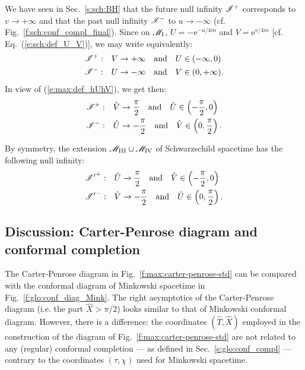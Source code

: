 We have seen in Sec.~\ref{s:sch:BH} that the future null infinity $\mathscr{I}^+$
corresponds to $v\rightarrow +\infty$ and that the past null infinity
$\mathscr{I}^-$ to $u\rightarrow -\infty$ (cf. Fig.~\ref{f:sch:conf_compl_final}).
Since on $\mathscr{M}_{\rm I}$, $U = - \mathrm{e}^{-u/4m}$ and $V = \mathrm{e}^{v/4m}$
[cf. Eq.~(\ref{e:sch:def_U_V})], we
may write equivalently:
\begin{subequations}
\begin{align}
    \mathscr{I}^+:&\quad V\rightarrow +\infty \quad\mbox{and}\quad U \in (-\infty, 0) \\
    \mathscr{I}^-:&\quad U\rightarrow -\infty \quad\mbox{and}\quad V \in (0,+\infty) .
\end{align}
\end{subequations}
In view of (\ref{e:max:def_hUhV}), we get then:
\begin{subequations}
\label{e:max:scri_hUhV}
\begin{align}
    \mathscr{I}^+:&\quad \hat{V}\rightarrow \frac{\pi}{2} \quad\mbox{and}\quad
        \hat{U} \in \left( -\frac{\pi}{2} , 0 \right) \\
    \mathscr{I}^-:&\quad \hat{U}\rightarrow -\frac{\pi}{2} \quad\mbox{and}\quad
         \hat{V} \in \left( 0 ,  \frac{\pi}{2} \right).
\end{align}
\end{subequations}

By symmetry, the extension $\mathscr{M}_{\rm III}\cup \mathscr{M}_{\rm IV}$ of Schwarzschild
spacetime has the following null infinity:
\begin{subequations}
\label{e:max:scri_prime_hUhV}
\begin{align}
    {\mathscr{I}'}^+:&\quad \hat{U}\rightarrow \frac{\pi}{2} \quad\mbox{and}\quad
        \hat{V} \in \left( -\frac{\pi}{2} , 0 \right) \\
    {\mathscr{I}'}^-:&\quad \hat{V}\rightarrow -\frac{\pi}{2} \quad\mbox{and}\quad
        \hat{U}\in \left( 0 ,  \frac{\pi}{2} \right).
\end{align}
\end{subequations}

\subsection{Discussion: Carter-Penrose diagram and conformal completion}
\label{s:max:discus_hUhV}

The Carter-Penrose diagram in Fig.~\ref{f:max:carter-penrose-std} can be compared with the conformal diagram
of Minkowski spacetime in Fig.~\ref{f:glo:conf_diag_Mink}.
The right asymptotics of the Carter-Penrose diagram
(i.e. the part $\hat{X}>\pi/2$) looks similar to that of
Minkowski conformal diagram.
However, there is a difference: the coordinates $(\hat{T},\hat{X})$
employed in the construction of the diagram of
Fig.~\ref{f:max:carter-penrose-std} are not related to any (regular) conformal
completion --- as defined in Sec.~\ref{s:glo:conf_compl} ---
contrary to the coordinates $(\tau,\chi)$ used for Minkowski spacetime.

